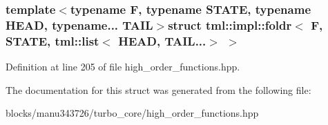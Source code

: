 \subsubsection*{template$<$typename F, typename S\+T\+A\+T\+E, typename H\+E\+A\+D, typename... T\+A\+I\+L$>$struct tml\+::impl\+::foldr$<$ F, S\+T\+A\+T\+E, tml\+::list$<$ H\+E\+A\+D, T\+A\+I\+L...$>$ $>$}



Definition at line 205 of file high\+\_\+order\+\_\+functions.\+hpp.



The documentation for this struct was generated from the following file\+:\begin{DoxyCompactItemize}
\item 
blocks/manu343726/turbo\+\_\+core/high\+\_\+order\+\_\+functions.\+hpp\end{DoxyCompactItemize}

